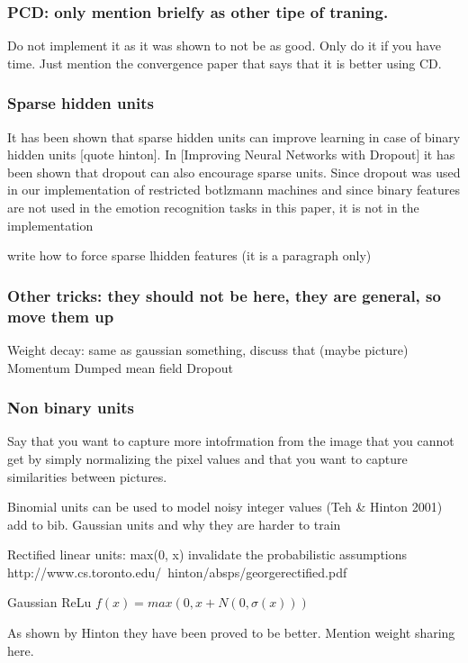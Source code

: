 \documentclass[11pt, fleqn, twoside]{article}
\begin{document}
\subsubsection{ PCD: only mention brielfy as other tipe of traning.}
  Do not implement it as it was shown to not be as good.
  Only do it if you have time.
  Just mention the convergence paper that says that it is better using CD.

\subsubsection{Sparse hidden units}

  It has been shown that sparse hidden units can improve learning in case of binary hidden units [quote hinton]. In [Improving Neural Networks with Dropout] it has been shown that dropout can also encourage sparse units. Since dropout was used in our implementation of restricted botlzmann machines and since binary features are not used in the emotion recognition tasks in this paper, it is not in the implementation

  write how to force sparse lhidden features (it is a paragraph only)

\subsubsection{Other tricks: they should not be here, they are general, so move them up}

  Weight decay: same as gaussian something, discuss that (maybe picture)
  Momentum
  Dumped mean field
  Dropout


\subsubsection{Non binary units}
  Say  that you want to capture more intofrmation from the image that you cannot get by simply normalizing the pixel values and that you want to capture similarities between pictures.

  Binomial units can be used to model noisy integer values (Teh \& Hinton 2001) add to bib.
  Gaussian units and why they are harder to train

  Rectified linear units: max(0, x) invalidate the probabilistic assumptions
  http://www.cs.toronto.edu/~hinton/absps/georgerectified.pdf

  Gaussian ReLu
  $f(x) = max(0, x + N(0, \sigma(x)))$

  As shown by Hinton they have been proved to be better.
  Mention weight sharing here.
\end{document}
